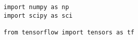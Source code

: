 \documentclass{article}
\begin{document}
\lstset{language=Python}
\lstset{frame=lines}
\lstset{basicstyle=\footnotesize}

\begin{lstlisting}
import numpy as np
import scipy as sci

from tensorflow import tensors as tf
\end{lstlisting}
\end{document}
